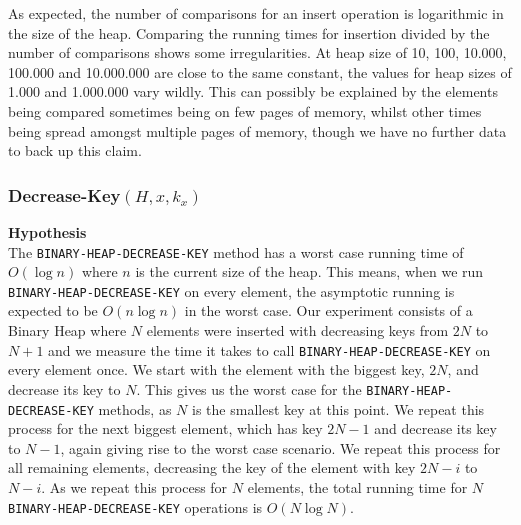 \documentclass[a4paper,10pt]{article}
\begin{document}
As expected, the number of comparisons for an insert operation is logarithmic in the size of the heap. Comparing the running times for insertion divided by the number of comparisons shows some irregularities. At heap size of 10, 100, 10.000, 100.000 and 10.000.000 are close to the same constant, the values for heap sizes of 1.000 and 1.000.000 vary wildly. This can possibly be explained by the elements being compared sometimes being on few pages of memory, whilst other times being spread amongst multiple pages of memory, though we have no further data to back up this claim.
\subsubsection{Decrease-Key$(H,x,k_x)$}
{\bf Hypothesis}\\
The \texttt{BINARY\--HEAP\--DECREASE\--KEY} method has a worst case running time of $O(\log n)$ where $n$ is the current size of the heap. This means, when we run \texttt{BINARY\--HEAP\--DECREASE\--KEY} on every element, the asymptotic running is expected to be $O(n\log n)$ in the worst case. Our experiment consists of a Binary Heap where $N$ elements were inserted with decreasing keys from $2N$ to $N+1$ and we measure the time it takes to call \texttt{BINARY\--HEAP\--DECREASE\--KEY} on every element once. We start with the element with the biggest key, $2N$, and decrease its key to $N$. This gives us the worst case for the \texttt{BINARY\--HEAP\--DECREASE\--KEY} methods, as $N$ is the smallest key at this point. We repeat this process for the next biggest element, which has key $2N-1$ and decrease its key to $N-1$, again giving rise to the worst case scenario. We repeat this process for all remaining elements, decreasing the key of the element with key $2N-i$ to $N-i$. As we repeat this process for $N$ elements, the total running time for $N$ \texttt{BINARY\--HEAP\--DECREASE\--KEY} operations is $O(N\log N)$.
\end{document}
